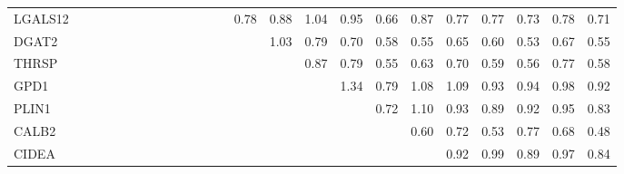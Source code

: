 \begin{longtable}{lrrrrrrrrrrrrrrrrrrrrrrr}
LGALS12 &               &             &              &           &               &              &            &             &            &              &            &               &        0.78 &        0.88 &       1.04 &        0.95 &        0.66 &        0.87 &        0.77 &        0.77 &       0.73 &       0.78 &         0.71 \\
DGAT2   &               &             &              &           &               &              &            &             &            &              &            &               &             &        1.03 &       0.79 &        0.70 &        0.58 &        0.55 &        0.65 &        0.60 &       0.53 &       0.67 &         0.55 \\
THRSP   &               &             &              &           &               &              &            &             &            &              &            &               &             &             &       0.87 &        0.79 &        0.55 &        0.63 &        0.70 &        0.59 &       0.56 &       0.77 &         0.58 \\
GPD1    &               &             &              &           &               &              &            &             &            &              &            &               &             &             &            &        1.34 &        0.79 &        1.08 &        1.09 &        0.93 &       0.94 &       0.98 &         0.92 \\
PLIN1   &               &             &              &           &               &              &            &             &            &              &            &               &             &             &            &             &        0.72 &        1.10 &        0.93 &        0.89 &       0.92 &       0.95 &         0.83 \\
CALB2   &               &             &              &           &               &              &            &             &            &              &            &               &             &             &            &             &             &        0.60 &        0.72 &        0.53 &       0.77 &       0.68 &         0.48 \\
CIDEA   &               &             &              &           &               &              &            &             &            &              &            &               &             &             &            &             &             &             &        0.92 &        0.99 &       0.89 &       0.97 &         0.84 \\

\end{longtable}
